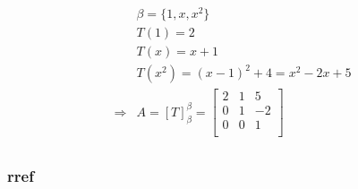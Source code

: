 \documentclass{article}
\begin{document}
~

\begin{equation*}
    \begin{split}
        &\beta=\{1,x,x^2\}\\
        &T(1)=2\\
        &T(x)=x+1\\
        &T(x^2)=(x-1)^2+4=x^2-2x+5\\
        \Rightarrow&A=\left[T\right]^\beta_\beta=\begin{bmatrix}
            2&1&5\\
            0&1&-2\\
            0&0&1\\
        \end{bmatrix}\\
    \end{split}
\end{equation*}

\subsubsection{rref}

~
\end{document}
